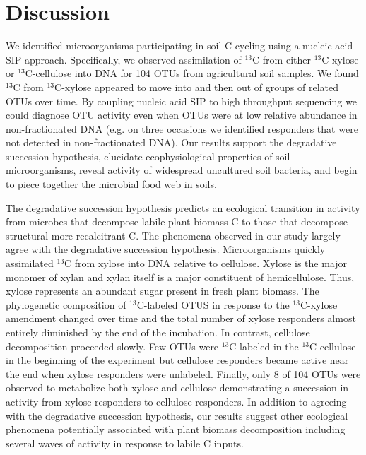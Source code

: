\section{Discussion} 
We identified microorganisms participating in soil C cycling using a nucleic
acid SIP approach. Specifically, we observed assimilation of $^{13}$C from
either $^{13}$C-xylose or $^{13}$C-cellulose into DNA for 104 OTUs from
agricultural soil samples. We found $^{13}$C from $^{13}$C-xylose appeared to
move into and then out of groups of related OTUs over time. By coupling nucleic
acid SIP to high throughput sequencing we could diagnose OTU activity even when
OTUs were at low relative abundance in non-fractionated DNA (e.g. on three
occasions we identified responders that were not detected in non-fractionated
DNA). Our results support the degradative succession hypothesis, elucidate
ecophysiological properties of soil microorganisms, reveal activity of
widespread uncultured soil bacteria, and begin to piece together the microbial
food web in soils. 

The degradative succession hypothesis predicts an ecological transition in
activity from microbes that decompose labile plant biomass C to those that
decompose structural more recalcitrant C. The phenomena observed in our study
largely agree with the degradative succession hypothesis. Microorganisms
quickly assimilated $^{13}$C from xylose into DNA relative to cellulose. Xylose
is the major monomer of xylan and xylan itself is a major constituent of
hemicellulose. Thus, xylose represents an abundant sugar present in fresh plant
biomass. The phylogenetic composition of $^{13}$C-labeled OTUS in response to
the $^{13}$C-xylose amendment changed over time and the total number of xylose
responders almost entirely diminished by the end of the incubation. In
contrast, cellulose decomposition proceeded slowly. Few OTUs were
$^{13}$C-labeled in the $^{13}$C-cellulose in the beginning of the experiment
but cellulose responders became active near the end when xylose responders were
unlabeled. Finally, only 8 of 104 OTUs were observed to metabolize both xylose
and cellulose demonstrating a succession in activity from xylose responders to
cellulose responders. In addition to agreeing with the degradative succession
hypothesis, our results suggest other ecological phenomena potentially
associated with plant biomass decomposition including several waves of activity
in response to labile C inputs.  

